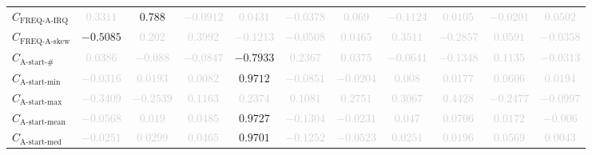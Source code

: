 \documentclass{standalone}
\newcommand{\startactivitiesname}{\text{A-start-\#}}
\newcommand{\startactivities}{C_{\startactivitiesname}}
\newcommand{\startminname}{\text{A-start-min}}
\newcommand{\startmin}{C_{\startminname}}
\newcommand{\startmaxname}{\text{A-start-max}}
\newcommand{\startmax}{C_{\startmaxname}}
\newcommand{\startmeanname}{\text{A-start-mean}}
\newcommand{\startmean}{C_{\startmeanname}}
\newcommand{\startmedianname}{\text{A-start-med}}
\newcommand{\startmedian}{C_{\startmedianname}}
\newcommand{\actfreqiqrname}{\text{FREQ-A-IRQ}}
\newcommand{\actfreqiqr}{C_{\actfreqiqrname}}
\newcommand{\actfreqskewname}{\text{FREQ-A-skew}}
\newcommand{\actfreqskew}{C_{\actfreqskewname}}
\begin{document}
\begin{tabular}{lcccccccccc}
$\actfreqiqr$ & \textcolor{lightgray}{$0.3311$} & $0.788$ & \textcolor{lightgray}{$-0.0912$} & \textcolor{lightgray}{$0.0431$} & \textcolor{lightgray}{$-0.0378$} & \textcolor{lightgray}{$0.069$} & \textcolor{lightgray}{$-0.1124$} & \textcolor{lightgray}{$0.0105$} & \textcolor{lightgray}{$-0.0201$} & \textcolor{lightgray}{$0.0502$} \\ 
$\actfreqskew$ & $-0.5085$ & \textcolor{lightgray}{$0.202$} & \textcolor{lightgray}{$0.3992$} & \textcolor{lightgray}{$-0.1213$} & \textcolor{lightgray}{$-0.0508$} & \textcolor{lightgray}{$0.0465$} & \textcolor{lightgray}{$0.3511$} & \textcolor{lightgray}{$-0.2857$} & \textcolor{lightgray}{$0.0591$} & \textcolor{lightgray}{$-0.0358$} \\ 
$\startactivities$ & \textcolor{lightgray}{$0.0386$} & \textcolor{lightgray}{$-0.088$} & \textcolor{lightgray}{$-0.0847$} & $-0.7933$ & \textcolor{lightgray}{$0.2367$} & \textcolor{lightgray}{$0.0375$} & \textcolor{lightgray}{$-0.0641$} & \textcolor{lightgray}{$-0.1348$} & \textcolor{lightgray}{$0.1135$} & \textcolor{lightgray}{$-0.0313$} \\ 
$\startmin$ & \textcolor{lightgray}{$-0.0316$} & \textcolor{lightgray}{$0.0193$} & \textcolor{lightgray}{$0.0082$} & $0.9712$ & \textcolor{lightgray}{$-0.0851$} & \textcolor{lightgray}{$-0.0204$} & \textcolor{lightgray}{$0.008$} & \textcolor{lightgray}{$0.0177$} & \textcolor{lightgray}{$0.0606$} & \textcolor{lightgray}{$0.0194$} \\ 
$\startmax$ & \textcolor{lightgray}{$-0.3409$} & \textcolor{lightgray}{$-0.2539$} & \textcolor{lightgray}{$0.1163$} & \textcolor{lightgray}{$0.2374$} & \textcolor{lightgray}{$0.1081$} & \textcolor{lightgray}{$0.2751$} & \textcolor{lightgray}{$0.3067$} & \textcolor{lightgray}{$0.4428$} & \textcolor{lightgray}{$-0.2477$} & \textcolor{lightgray}{$-0.0997$} \\ 
$\startmean$ & \textcolor{lightgray}{$-0.0568$} & \textcolor{lightgray}{$0.019$} & \textcolor{lightgray}{$0.0485$} & $0.9727$ & \textcolor{lightgray}{$-0.1304$} & \textcolor{lightgray}{$-0.0231$} & \textcolor{lightgray}{$0.047$} & \textcolor{lightgray}{$0.0706$} & \textcolor{lightgray}{$0.0172$} & \textcolor{lightgray}{$-0.006$} \\ 
$\startmedian$ & \textcolor{lightgray}{$-0.0251$} & \textcolor{lightgray}{$0.0299$} & \textcolor{lightgray}{$0.0465$} & $0.9701$ & \textcolor{lightgray}{$-0.1252$} & \textcolor{lightgray}{$-0.0523$} & \textcolor{lightgray}{$0.0251$} & \textcolor{lightgray}{$0.0196$} & \textcolor{lightgray}{$0.0569$} & \textcolor{lightgray}{$0.0043$} \\ 

\end{tabular}
\end{document}
